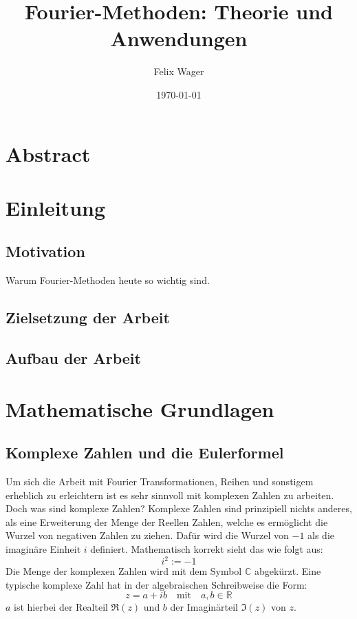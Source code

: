 \documentclass[a4paper,12pt]{article}
\title{Fourier-Methoden: Theorie und Anwendungen}
\author{Felix Wager}
\date{\today}
\theoremstyle{definition}
\theoremstyle{remark}
\begin{document}
\maketitle

\renewcommand{\contentsname}{Inhaltsverzeichnis}
\tableofcontents
\newpage


\section{Abstract}

\section{Einleitung}
\subsection{Motivation}
Warum Fourier-Methoden heute so wichtig sind.
\subsection{Zielsetzung der Arbeit}
\subsection{Aufbau der Arbeit}

\section{Mathematische Grundlagen}
\subsection{Komplexe Zahlen und die Eulerformel}
Um sich die Arbeit mit Fourier Transformationen, Reihen und sonstigem erheblich zu erleichtern ist es sehr sinnvoll mit komplexen Zahlen zu arbeiten. Doch was sind komplexe Zahlen? 
Komplexe Zahlen sind prinzipiell nichts anderes, als eine Erweiterung der Menge der Reellen Zahlen, welche es ermöglicht die Wurzel von negativen Zahlen zu ziehen. Dafür wird die Wurzel von $-1$ als die imaginäre Einheit $i$ definiert. Mathematisch korrekt sieht das wie folgt aus:
$$i^2 := -1$$
Die Menge der komplexen Zahlen wird mit dem Symbol $\mathbb{C}$ abgekürzt. Eine typische komplexe Zahl hat in der algebraischen Schreibweise die Form:
$$ z = a + ib \quad \text{mit} \quad a,b \in \mathbb{R} $$
$a$ ist hierbei der Realteil $\Re(z)$ und $b$ der Imaginärteil $\Im(z)$ von $z$. \vspace{1em}
\end{document}

